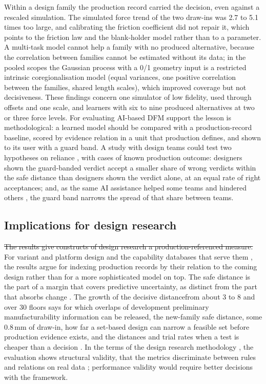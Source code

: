\documentclass[pdflatex,sn-basic,lineno]{sn-jnl}
\providecommand{\DIFadd}[1]{{\protect\color{blue}\uwave{#1}}} %
\providecommand{\DIFdel}[1]{{\protect\color{red}\sout{#1}}}                      %
\providecommand{\DIFaddbegin}{} %
\providecommand{\DIFaddend}{} %
\providecommand{\DIFdelbegin}{} %
\providecommand{\DIFdelend}{} %
\newcommand{\DIFscaledelfig}{0.5}
\newlength{\DIFdelgraphicswidth} %
\newlength{\DIFdelgraphicsheight} %
\newcommand{\DIFaddincludegraphics}[2][]{{\color{blue}\fbox{\DIFOincludegraphics[#1]{#2}}}} %
\newcommand{\DIFdelincludegraphics}[2][]{%
\sbox{\DIFdelgraphicsbox}{\DIFOincludegraphics[#1]{#2}}%
\settoboxwidth{\DIFdelgraphicswidth}{\DIFdelgraphicsbox} %
\settoboxtotalheight{\DIFdelgraphicsheight}{\DIFdelgraphicsbox} %
\scalebox{\DIFscaledelfig}{%
\parbox[b]{\DIFdelgraphicswidth}{\usebox{\DIFdelgraphicsbox}\\[-\baselineskip] \rule{\DIFdelgraphicswidth}{0em}}\llap{\resizebox{\DIFdelgraphicswidth}{\DIFdelgraphicsheight}{%
\setlength{\unitlength}{\DIFdelgraphicswidth}%
\begin{picture}(1,1)%
\thicklines\linethickness{2pt} %
{\color[rgb]{1,0,0}\put(0,0){\framebox(1,1){}}}%
{\color[rgb]{1,0,0}\put(0,0){\line( 1,1){1}}}%
{\color[rgb]{1,0,0}\put(0,1){\line(1,-1){1}}}%
\end{picture}%
}\hspace*{3pt}}} %
} %
\DeclareRobustCommand{\DIFaddbegin}{\DIFOaddbegin \let\includegraphics\DIFaddincludegraphics} %
\DeclareRobustCommand{\DIFaddend}{\DIFOaddend \let\includegraphics\DIFOincludegraphics} %
\DeclareRobustCommand{\DIFdelbegin}{\DIFOdelbegin \let\includegraphics\DIFdelincludegraphics} %
\DeclareRobustCommand{\DIFdelend}{\DIFOaddend \let\includegraphics\DIFOincludegraphics} %
\begin{document}
Within a design family the production record carried the decision, even against a rescaled simulation. The simulated force trend of the two draw-ins was 2.7 to 5.1 times too large, and calibrating the friction coefficient did not repair it, which points to the friction law and the blank-holder model rather than to a parameter. A multi-task model cannot help a family with no produced alternative, because the correlation between families cannot be estimated without its data; in the pooled scopes the Gaussian process with a 0/1 geometry input is a restricted intrinsic coregionalisation model (equal variances, one positive correlation between the families, shared length scales), which improved coverage but not decisiveness. These findings concern one simulator of low fidelity, used through offsets and one scale, and learners with six to nine produced alternatives at two or three force levels. For evaluating AI-based DFM support the lesson is methodological: a learned model should be compared with a production-record baseline, scored by evidence relation in a unit that production defines, and shown to its user with a guard band. A study with design teams could test two hypotheses on reliance \citep{lee2004trust}, with cases of known production outcome: designers shown the guard-banded verdict accept a smaller share of wrong verdicts within the safe distance than designers shown the verdict alone, at an equal rate of right acceptances; and, as the same AI assistance helped some teams and hindered others \citep{zhang2021cautionary}, the guard band narrows the spread of that share between teams.

\subsection{Implications for design research}

\DIFdelbegin \DIFdel{The results give constructs of design research a production-referenced measure. }\DIFdelend For variant and platform design \citep{pahl2007engineering, simpson2006product} and the capability databases that serve them \citep{tata1999process, thornton2004variation}, the results argue for indexing production records by their relation to the coming design rather than for a more sophisticated model on top. The safe distance is the part of a margin that covers predictive uncertainty, as distinct from the part that absorbs change \citep{eckert2017safety, eckert2019design}. The growth of the decisive distance\DIFaddbegin \DIFadd{, pooled over strata, }\DIFaddend from about 3 to 8 and over 30 floors says for which overlaps of development \citep{krishnan1997model, terwiesch2002exchanging} preliminary manufacturability information can be released, the new-family safe distance, some 0.8\,mm of draw-in, how far a set-based design \citep{sobek1999toyota} can narrow a feasible set before production evidence exists, and the distances and trial rates when a test is cheaper than a decision \citep{thomke2001sequential, salado2018mathematical}. In the terms of the design research methodology \citep{blessing2009drm}, the evaluation shows structural validity, that the metrics discriminate between rules and relations on real data \citep{seepersad2006validation}; performance validity would require better decisions with the framework.
\end{document}
